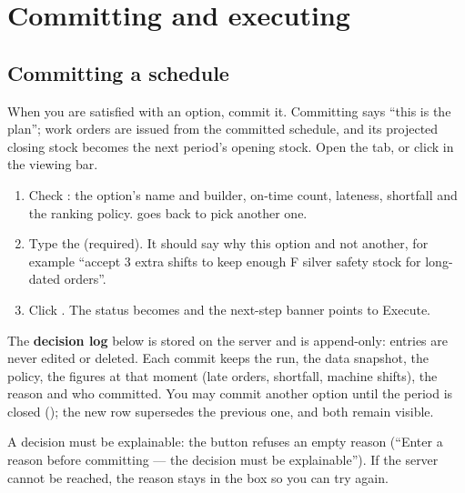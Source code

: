 \chapter{Committing and executing}\label{ch:execute}

\section{Committing a schedule}\label{sec:commit}

When you are satisfied with an option, commit it. Committing says ``this is the plan''; work orders are
issued from the committed schedule, and its projected closing stock becomes the next period's opening stock.
Open the  tab, or click  in the viewing bar.


\begin{steps}
\begin{enumerate}
  \item Check : the option's name and builder, on-time count, lateness, shortfall and
        the ranking policy.  goes back to pick another one.
  \item Type the  (required). It should say why this option and not another, for example ``accept
        3 extra shifts to keep enough F silver safety stock for long-dated orders''.
  \item Click . The status becomes  and the next-step banner points to
        Execute.
\end{enumerate}
\end{steps}

The \textbf{decision log} below is stored on the server and is append-only: entries are never edited or
deleted. Each commit keeps the run, the data snapshot, the policy, the figures at that moment (late orders,
shortfall, machine shifts), the reason and who committed. You may commit another option until the period is
closed (); the new row supersedes the previous one, and both remain visible.

\begin{note}
A decision must be explainable: the button refuses an empty reason (``Enter a reason before committing ---
the decision must be explainable''). If the server cannot be reached, the reason stays in the box so you can
try again.
\end{note}

